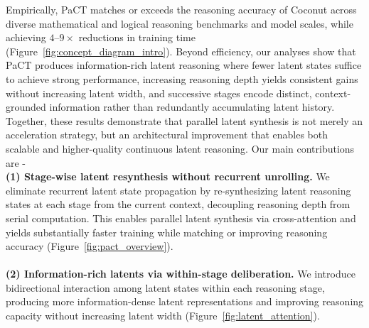 Empirically, PaCT matches or exceeds the reasoning accuracy of Coconut across diverse mathematical and logical reasoning benchmarks and model scales, while achieving $4$--$9\times$ reductions in training time (Figure~\ref{fig:concept_diagram_intro}). Beyond efficiency, our analyses show that PaCT produces information-rich latent reasoning where fewer latent states suffice to achieve strong performance, increasing reasoning depth yields consistent gains without increasing latent width, and successive stages encode distinct, context-grounded information rather than redundantly accumulating latent history. Together, these results demonstrate that parallel latent synthesis is not merely an acceleration strategy, but an architectural improvement that enables both scalable and higher-quality continuous latent reasoning. Our main contributions are -\\
\textbf{(1) Stage-wise latent resynthesis without recurrent unrolling.}
We eliminate recurrent latent state propagation by re-synthesizing latent reasoning states at each stage from the current context, decoupling reasoning depth from serial computation. This enables parallel latent synthesis via cross-attention and yields substantially faster training while matching or improving reasoning accuracy (Figure~\ref{fig:pact_overview}).\\\\
\textbf{(2) Information-rich latents via within-stage deliberation.}
We introduce bidirectional interaction among latent states within each reasoning stage, producing more information-dense latent representations and improving reasoning capacity without increasing latent width (Figure~\ref{fig:latent_attention}).

